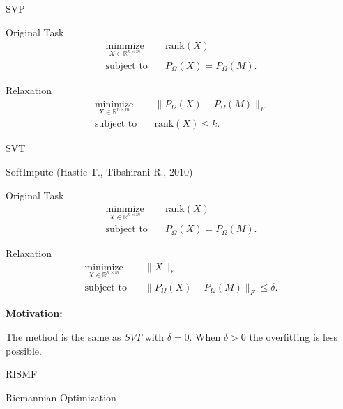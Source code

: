 \documentclass{beamer}
\begin{document}
\begin{frame}{SVP}
	\begin{block}{Original Task}
		\vspace{-0.5cm}
		\begin{align*}
		\mathop{\text{minimize}}\limits_{X \in \mathbb{R}^{n \times m}} \quad & 
		\text{rank} (X) \\
		\text{subject to} \quad & P_{\Omega} (X) = P_{\Omega} (M).
		\end{align*}
	\end{block}
	\begin{block}{Relaxation}
		\vspace{-0.5cm}
		\begin{align*}
		\mathop{\text{minimize}}\limits_{X \in \mathbb{R}^{n \times m}} \quad & 
		\| P_{\Omega} (X) - P_{\Omega} (M) \|_F \\
		\text{subject to} \quad & \text{rank} (X) \leq k.
		\end{align*}
	\end{block}
\end{frame}
\begin{frame}{SVT}
\end{frame}
\begin{frame}{SoftImpute (Hastie T., Tibshirani R., 2010)}
\begin{block}{Original Task}
	\vspace{-0.5cm}
		\begin{align*}
		\mathop{\text{minimize}}\limits_{X \in \mathbb{R}^{n \times m}} \quad & 
		\text{rank} (X) \\
		\text{subject to} \quad & P_{\Omega} (X) = P_{\Omega} (M).
		\end{align*}
\end{block}
\begin{block}{Relaxation}
\vspace{-0.5cm}
	\begin{align*}
		\mathop{\text{minimize}}\limits_{X \in \mathbb{R}^{n \times m}} \quad & 
		\| X \|_* \\
		\text{subject to} \quad & \| P_{\Omega} (X) - P_{\Omega} (M) \|_F \leq \delta.
	\end{align*}
\end{block}
	\textbf{Motivation:}
	
		The method is the same as $SVT$ with $\delta = 0$. When $\delta>0$ the overfitting is less possible. 
\end{frame}
\begin{frame}{RISMF}
	
\end{frame}
\begin{frame}{Riemannian Optimization}
\end{frame}
\end{document}
